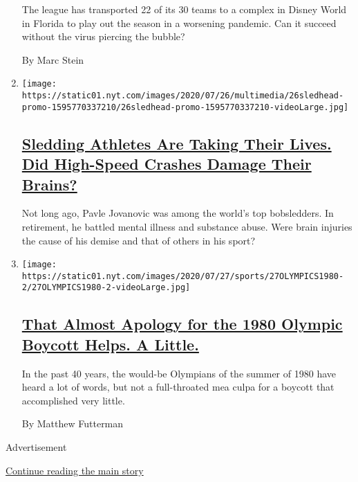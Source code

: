\begin{enumerate}
  The league has transported 22 of its 30 teams to a complex in Disney
  World in Florida to play out the season in a worsening pandemic. Can
  it succeed without the virus piercing the bubble?

  By Marc Stein
\item
  \texttt{[image: https://static01.nyt.com/images/2020/07/26/multimedia/26sledhead-promo-1595770337210/26sledhead-promo-1595770337210-videoLarge.jpg]}

  \hypertarget{sledding-athletes-are-taking-their-lives-did-high-speed-crashes-damage-their-brains}{%
  \subsection{\texorpdfstring{\href{https://www.nytimes.com/2020/07/26/sports/olympics/olympics-bobsled-suicide-brain-injuries.html}{Sledding
  Athletes Are Taking Their Lives. Did High-Speed Crashes Damage Their
  Brains?}}{Sledding Athletes Are Taking Their Lives. Did High-Speed Crashes Damage Their Brains?}}\label{sledding-athletes-are-taking-their-lives-did-high-speed-crashes-damage-their-brains}}

  Not long ago, Pavle Jovanovic was among the world's top bobsledders.
  In retirement, he battled mental illness and substance abuse. Were
  brain injuries the cause of his demise and that of others in his
  sport?
\item
  \texttt{[image: https://static01.nyt.com/images/2020/07/27/sports/27OLYMPICS1980-2/27OLYMPICS1980-2-videoLarge.jpg]}

  \hypertarget{that-almost-apology-for-the-1980-olympic-boycott-helps-a-little}{%
  \subsection{\texorpdfstring{\href{/2020/07/27/sports/olympics/1980-boycott.html}{That
  Almost Apology for the 1980 Olympic Boycott Helps. A
  Little.}}{That Almost Apology for the 1980 Olympic Boycott Helps. A Little.}}\label{that-almost-apology-for-the-1980-olympic-boycott-helps-a-little}}

  In the past 40 years, the would-be Olympians of the summer of 1980
  have heard a lot of words, but not a full-throated mea culpa for a
  boycott that accomplished very little.

  By Matthew Futterman
\end{enumerate}

Advertisement

\protect\hyperlink{after-mid1}{Continue reading the main story}

